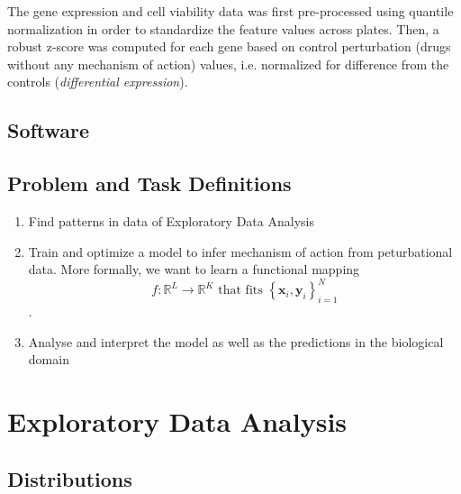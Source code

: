 \documentclass[bsc,frontabs,twoside,singlespacing,parskip,deptreport]{infthesis}     %
\let\Oldsection\section
\renewcommand{\section}{\FloatBarrier\Oldsection}
\begin{document}
The gene expression and cell viability data was first pre-processed using quantile normalization in order to standardize the feature values across plates. Then, a robust z-score was computed for each gene based on control perturbation (drugs without any mechanism of action) values, i.e. normalized for difference from the controls (\textit{differential expression}).

\section{Software}

\section{Problem and Task Definitions}
\begin{enumerate}
    \item Find patterns in data of Exploratory Data Analysis
    \item Train and optimize a model to infer mechanism of action from peturbational data. More formally, we want to learn a functional mapping \[f: \mathbb{R}^{L} \rightarrow \mathbb{R}^{K} \text { that fits }\left\{\mathbf{x}_{i}, \mathbf{y}_{i}\right\}_{i=1}^{N}\].
    \item Analyse and interpret the model as well as the predictions in the biological domain 
\end{enumerate}



\chapter{Exploratory Data Analysis}
\section{Distributions}\label{data distribution}
\end{document}
